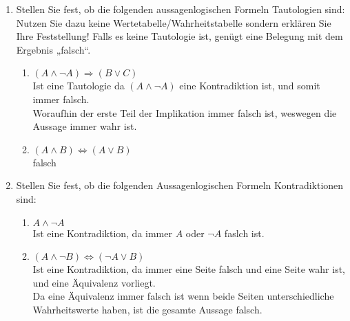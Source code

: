 \documentclass[a4paper,onecolumn,pdftex]{report}
\begin{document}
\begin{enumerate}
        \vspace{50px}
        \item Stellen Sie fest, ob die folgenden aussagenlogischen Formeln Tautologien sind: Nutzen Sie dazu keine Wertetabelle/Wahrheitstabelle sondern erklären Sie Ihre Feststellung! Falls es keine Tautologie ist, genügt eine Belegung mit dem Ergebnis „falsch“. 
        \begin{enumerate}
            \item $(A \wedge \neg A) \Rightarrow (B \lor C)$ \\
            Ist eine Tautologie da $(A \wedge \neg A)$ eine Kontradiktion ist, und somit immer falsch. \\
            Woraufhin der erste Teil der Implikation immer falsch ist, weswegen die Aussage immer wahr ist.
            
            \item $(A \wedge B) \Leftrightarrow (A \lor B)$ \\
            falsch
        \end{enumerate}
    
        \vspace{50px}
        \item Stellen Sie fest, ob die folgenden Aussagenlogischen Formeln Kontradiktionen sind: 
        \begin{enumerate}
            \item $A \wedge \neg A$ \\
            Ist eine Kontradiktion, da immer $A$ oder $\neg A$ faslch ist.
            
            \item $(A \wedge \neg B) \Leftrightarrow (\neg A \lor B)$ \\
            Ist eine Kontradiktion, da immer eine Seite falsch und eine Seite wahr ist, und eine Äquivalenz vorliegt. \\
            Da eine Äquivalenz immer falsch ist wenn beide Seiten unterschiedliche Wahrheitswerte haben, ist die gesamte Aussage falsch.
        \end{enumerate}
    

\end{enumerate}
\end{document}
